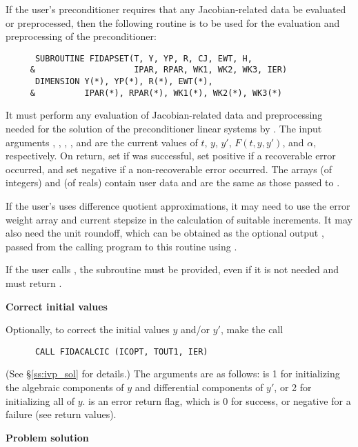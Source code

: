 \begin{Steps}
  If the user's preconditioner requires that any Jacobian-related data be evaluated
  or preprocessed, then the following routine is to be used for the evaluation and 
  preprocessing of the preconditioner:
\begin{verbatim}
      SUBROUTINE FIDAPSET(T, Y, YP, R, CJ, EWT, H, 
     &                    IPAR, RPAR, WK1, WK2, WK3, IER)
      DIMENSION Y(*), YP(*), R(*), EWT(*), 
     &          IPAR(*), RPAR(*), WK1(*), WK2(*), WK3(*) 
\end{verbatim}
  It must perform any evaluation of Jacobian-related data and preprocessing needed
  for the solution of the preconditioner linear systems by .
  The input arguments , , , , and  are the
  current values of $t$, $y$, $y'$, $F(t,y,y')$, and $\alpha$, respectively.
  On return, set  if  was successful, set 
  positive if a recoverable error occurred, and set  negative if a 
  non-recoverable error occurred.
  The arrays  (of integers) and  (of reals) contain user data
  and are the same as those passed to .

  If the user's  uses difference quotient approximations, it
  may need to use the error weight array  and current stepsize 
  in the calculation of suitable increments.  It may also need the unit
  roundoff, which can be obtained as the optional output ,
  passed from the calling program to this routine using .

  {\warn} If the user calls ,
  the subroutine  must be provided, even if it is not needed and
  must return .

\item {\bf Correct initial values}

  Optionally, to correct the initial values $y$ and/or $y'$, make the call
\begin{verbatim}
      CALL FIDACALCIC (ICOPT, TOUT1, IER)
\end{verbatim}
  (See \S\ref{ss:ivp_sol} for details.)  The arguments are as follows:
   is 1 for initializing the algebraic components of $y$ and
  differential components of $y'$, or 2 for initializing all of $y$.
   is an error return flag, which is 0 for success, or negative
  for a failure (see  return values).

\item {\bf Problem solution}


\end{Steps}

